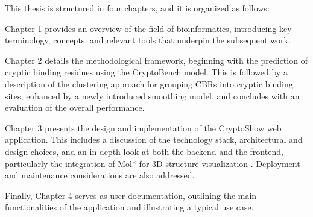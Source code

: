 This thesis is structured in four chapters, and it is organized as follows:

Chapter 1 provides an overview of the field of bioinformatics, introducing key terminology, concepts, and relevant tools that underpin the subsequent work.

Chapter 2 details the methodological framework, beginning with the prediction of cryptic binding residues using the CryptoBench model. This is followed by a description of the clustering approach for grouping CBRs into cryptic binding sites, enhanced by a newly introduced smoothing model, and concludes with an evaluation of the overall performance.

Chapter 3 presents the design and implementation of the CryptoShow web application. This includes a discussion of the technology stack, architectural and design choices, and an in-depth look at both the backend and the frontend, particularly the integration of Mol* for 3D structure visualization \cite{sehnal2021mol}. Deployment and maintenance considerations are also addressed.

Finally, Chapter 4 serves as user documentation, outlining the main functionalities of the application and illustrating a typical use case.
